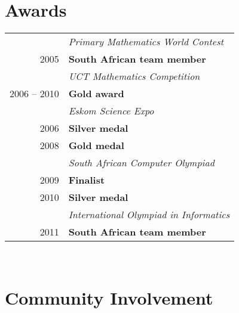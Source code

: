\documentclass[a4paper,10pt]{article} %
\begin{document}
\begin{minipage}[t]{0.44\textwidth} 
\vspace{0pt} %



\section{Awards} 

\begin{tabular}{rl}
& \textit{Primary Mathematics World Contest}\\
2005 & \textbf{South African team member}\\[5pt]

& \textit{UCT Mathematics Competition}\\
2006 -- 2010 & \textbf{Gold award}\\[5pt]

& \textit{Eskom Science Expo}\\
2006 & \textbf{Silver medal}\\
2008 & \textbf{Gold medal}\\[5pt]

& \textit{South African Computer Olympiad}\\
2009 & \textbf{Finalist}\\
2010 & \textbf{Silver medal}\\[5pt]

& \textit{International Olympiad in Informatics}\\
2011 & \textbf{South African team member}
\end{tabular}\\[10pt]



\section{Community Involvement}


\end{minipage}
\end{document}
